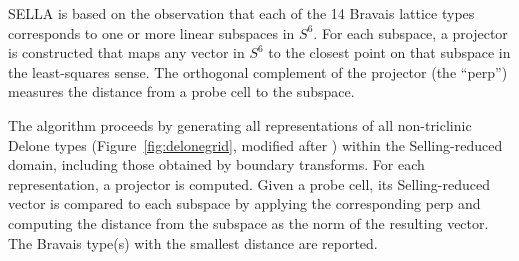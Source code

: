 \documentclass[preprint]{iucr}              %
\begin{document}
	SELLA is based on the observation that each of the 14 Bravais lattice types corresponds to one
	or more linear subspaces in $S^6$. For each subspace, a projector is
	constructed that maps any vector in $S^6$ to the closest point on that
	subspace in the least-squares sense. The orthogonal complement of the
	projector (the ``perp'') measures the distance from a probe cell to the
	subspace.
	
	The algorithm proceeds by generating all representations of all non-triclinic
	Delone types (Figure~\ref{fig:delonegrid}, modified after )
	within the Selling-reduced domain, including those obtained by
	boundary transforms. For each representation, a projector is computed. Given a
	probe cell, its Selling-reduced vector is compared to each subspace by
	applying the corresponding perp and computing the distance 
	from the subspace as the norm of the resulting vector. The Bravais type(s) with the smallest
	distance are reported.
	
\end{document}
